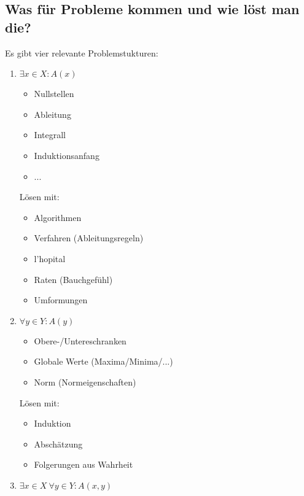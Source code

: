 
\subsection{Was für Probleme kommen und wie löst man die?}

Es gibt vier relevante Problemstukturen:
\begin{enumerate}[label=\arabic*)]
    \item $\exists x \in X : A(x)$
    \begin{itemize}
        \item Nullstellen
        \item Ableitung
        \item Integrall
        \item Induktionsanfang
        \item ...
    \end{itemize}
    Lösen mit: 
    \begin{itemize}
        \item Algorithmen
        \item Verfahren (Ableitungsregeln)
        \item l'hopital
        \item Raten (Bauchgefühl)
        \item Umformungen
    \end{itemize}
    \item $\forall y \in Y: A(y)$
    \begin{itemize}
        \item Obere-/Untereschranken
        \item Globale Werte (Maxima/Minima/...)
        \item Norm (Normeigenschaften)
    \end{itemize}
    Lösen mit:
    \begin{itemize}
        \item Induktion
        \item Abschätzung
        \item Folgerungen aus Wahrheit
    \end{itemize}
    \newpage
    \item $\exists x \in X \ \forall y \in Y: A(x, y)$

\end{enumerate}

